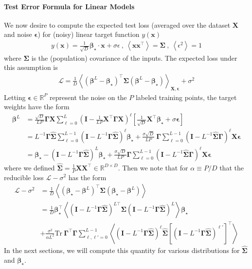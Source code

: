 \documentclass{article} %
\def\x{\bm x}
\begin{document}
\paragraph{Test Error Formula for Linear Models} We now desire to compute the expected test loss (averaged over the dataset $\bm X$ and noise $\bm\epsilon$) for (noisy) linear target function $y(\x)$
\begin{align}
    y(\bm x) = \frac{1}{\sqrt D} \bm\beta_\star \cdot \bm x + \sigma \epsilon  \ , \  \left< \bm x \bm x^\top \right> = \bm\Sigma  \ , \  \left< \epsilon^2 \right> = 1
\end{align}
where $\bm\Sigma$ is the (population) covariance of the inputs. The expected loss under this assumption is 
\begin{align}
    \mathcal L= \frac{1}{D} \left< \left (  \bm\beta^L - \bm\beta_\star \right)^\top \bm\Sigma \left(  \bm\beta^L - \bm\beta_\star \right)   \right>_{\bm X, \bm\epsilon} + \sigma^2
\end{align}
Letting $\bm\epsilon \in \mathbb{R}^P$ represent the noise on the $P$ labeled training points, the target weights have the form
\begin{align}
    \bm\beta^L &= \frac{\sqrt D}{L P} \bm\Gamma \bm X \sum_{\ell=0}^L \left( \bm I - \frac{1}{LP} \bm X^\top \bm \Gamma \bm X \right)^\ell \left[ \frac{1}{\sqrt D} \bm X^\top \bm\beta_\star  + \sigma \bm\epsilon \right] \nonumber
    \\
    &= L^{-1} \bm\Gamma \hat{\bm\Sigma} \sum_{\ell=0}^{L-1} \left( \bm I - L^{-1} \bm\Gamma \hat{\bm\Sigma} \right)^\ell \bm\beta_\star +  \frac{\sigma \sqrt{D}}{L P} \ \bm\Gamma \sum_{\ell=0}^{L-1} \left( \bm I - L^{-1} \hat{\bm\Sigma} \bm \Gamma \right)^{\ell} \bm X \bm\epsilon  \nonumber
    \\
    &= \bm\beta_\star - \left( \bm I - L^{-1} \bm\Gamma \hat{\bm\Sigma} \right)^L \bm\beta_\star +  \frac{\sigma \sqrt D}{L P} \bm\Gamma \sum_{\ell=0}^{L-1} \left( \bm I - L^{-1} \hat{\bm\Sigma} \bm \Gamma \right)^{\ell} \bm X \bm\epsilon 
\end{align}
where we defined $\hat{\bm\Sigma} = \frac{1}{P} \bm X \bm X^\top \in \mathbb{R}^{D \times D}$. Then we note that for $\alpha \equiv P / D$ that the reducible loss $\mathcal L - \sigma^2$ has the form 
\begin{align}
    \mathcal L - \sigma^2 &= \frac{1}{D} \left< \left( \bm\beta_\star - \bm\beta^L \right)^\top \bm\Sigma \left( \bm\beta_\star - \bm\beta^L \right)  \right> \nonumber
    \\
    &=  \frac{1}{D} \bm\beta_\star^\top \left< \left( \bm I - L^{-1} \bm\Gamma \hat{\bm\Sigma} \right)^{L \top} \bm\Sigma  \left( \bm I - L^{-1} \bm\Gamma \hat{\bm\Sigma} \right)^L  \right> \bm\beta_\star  \nonumber
    \\
    &+ \frac{\sigma^2}{\alpha L^2 } \text{Tr} \ \bm\Gamma^\top \bm\Gamma   \sum_{\ell,\ell' =0}^{L-1} \left< \left( \bm I - L^{-1} \bm\Gamma \hat{\bm\Sigma} \right)^{\ell} \hat{\bm\Sigma} \left[\left( \bm I - L^{-1} \bm\Gamma \hat{\bm\Sigma} \right)^{\ell'} \right]^\top  \right>
\end{align}
In the next sections, we will compute this quantity for various distributions for $\bm{\hat\Sigma}$ and $\bm\beta_\star$. 
\end{document}
